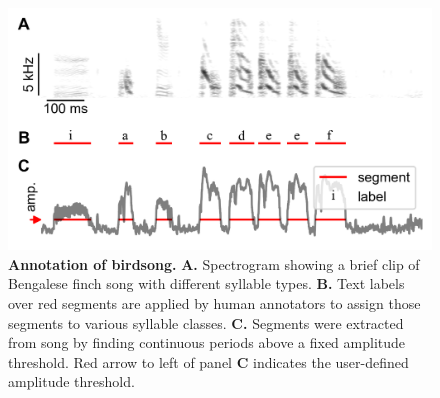\documentclass[10pt,letterpaper]{article}
\begin{document}
\begin{figure}[!ht]
\includegraphics[scale=1.0]{Figures/fig0/annotfig.png}
\caption{{\bf Annotation of birdsong.}
\textbf{A.} Spectrogram showing a brief clip of Bengalese finch song 
with different syllable types. 
\textbf{B.} Text labels over red segments are applied by human annotators to assign those segments to various syllable classes.
\textbf{C.} Segments were extracted from song by finding continuous periods above a fixed amplitude threshold.
Red arrow to left of panel \textbf{C} indicates the user-defined amplitude threshold.
}
\label{fig0}
\end{figure} 
\end{document}
